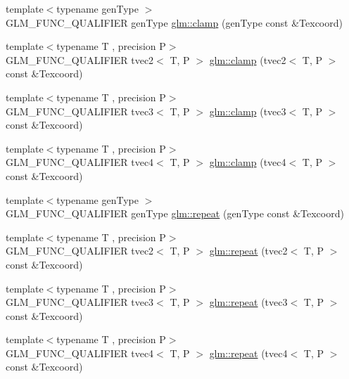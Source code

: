 \begin{DoxyCompactItemize}
\item 
{\footnotesize template$<$typename gen\+Type $>$ }\\G\+L\+M\+\_\+\+F\+U\+N\+C\+\_\+\+Q\+U\+A\+L\+I\+F\+I\+E\+R gen\+Type \hyperlink{group__gtx__wrap_ga6c0cc6bd1d67ea1008d2592e998bad33}{glm\+::clamp} (gen\+Type const \&Texcoord)
\item 
{\footnotesize template$<$typename T , precision P$>$ }\\G\+L\+M\+\_\+\+F\+U\+N\+C\+\_\+\+Q\+U\+A\+L\+I\+F\+I\+E\+R tvec2$<$ T, P $>$ \hyperlink{namespaceglm_a44107199d20102cbd6c9b64f72cfba55}{glm\+::clamp} (tvec2$<$ T, P $>$ const \&Texcoord)
\item 
{\footnotesize template$<$typename T , precision P$>$ }\\G\+L\+M\+\_\+\+F\+U\+N\+C\+\_\+\+Q\+U\+A\+L\+I\+F\+I\+E\+R tvec3$<$ T, P $>$ \hyperlink{namespaceglm_a020c0df6915c1ede86ffbd807a5b47c1}{glm\+::clamp} (tvec3$<$ T, P $>$ const \&Texcoord)
\item 
{\footnotesize template$<$typename T , precision P$>$ }\\G\+L\+M\+\_\+\+F\+U\+N\+C\+\_\+\+Q\+U\+A\+L\+I\+F\+I\+E\+R tvec4$<$ T, P $>$ \hyperlink{namespaceglm_a42bda64124cb7e94d86c1edb6025a932}{glm\+::clamp} (tvec4$<$ T, P $>$ const \&Texcoord)
\item 
{\footnotesize template$<$typename gen\+Type $>$ }\\G\+L\+M\+\_\+\+F\+U\+N\+C\+\_\+\+Q\+U\+A\+L\+I\+F\+I\+E\+R gen\+Type \hyperlink{group__gtx__wrap_ga809650c6310ea7c42666e918c117fb6f}{glm\+::repeat} (gen\+Type const \&Texcoord)
\item 
{\footnotesize template$<$typename T , precision P$>$ }\\G\+L\+M\+\_\+\+F\+U\+N\+C\+\_\+\+Q\+U\+A\+L\+I\+F\+I\+E\+R tvec2$<$ T, P $>$ \hyperlink{namespaceglm_a3f9751f6712e70e7bee9e86edaa23dc3}{glm\+::repeat} (tvec2$<$ T, P $>$ const \&Texcoord)
\item 
{\footnotesize template$<$typename T , precision P$>$ }\\G\+L\+M\+\_\+\+F\+U\+N\+C\+\_\+\+Q\+U\+A\+L\+I\+F\+I\+E\+R tvec3$<$ T, P $>$ \hyperlink{namespaceglm_a2f193fb57465ccc4888523a0c84c51f4}{glm\+::repeat} (tvec3$<$ T, P $>$ const \&Texcoord)
\item 
{\footnotesize template$<$typename T , precision P$>$ }\\G\+L\+M\+\_\+\+F\+U\+N\+C\+\_\+\+Q\+U\+A\+L\+I\+F\+I\+E\+R tvec4$<$ T, P $>$ \hyperlink{namespaceglm_ade6cefbc71237ce919649e93d4a9fd05}{glm\+::repeat} (tvec4$<$ T, P $>$ const \&Texcoord)

\end{DoxyCompactItemize}
